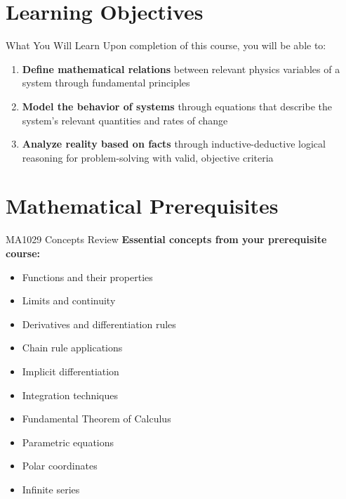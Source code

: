 \documentclass[10pt,aspectratio=169]{beamer}
\begin{document}
\section{Learning Objectives}

\begin{frame}{What You Will Learn}
    Upon completion of this course, you will be able to:
    
    \begin{enumerate}
        \item \textbf{Define mathematical relations} between relevant physics variables of a system through fundamental principles
        
        \item \textbf{Model the behavior of systems} through equations that describe the system's relevant quantities and rates of change
        
        \item \textbf{Analyze reality based on facts} through inductive-deductive logical reasoning for problem-solving with valid, objective criteria
    \end{enumerate}
\end{frame}

\section{Mathematical Prerequisites}

\begin{frame}{MA1029 Concepts Review}
    \textbf{Essential concepts from your prerequisite course:}
    
    \begin{multicols}{2}
    \begin{itemize}
        \item Functions and their properties
        \item Limits and continuity
        \item Derivatives and differentiation rules
        \item Chain rule applications
        \item Implicit differentiation
        \item Integration techniques
        \item Fundamental Theorem of Calculus
        \item Parametric equations
        \item Polar coordinates
        \item Infinite series
    \end{itemize}
    \end{multicols}
\end{frame}
\end{document}
